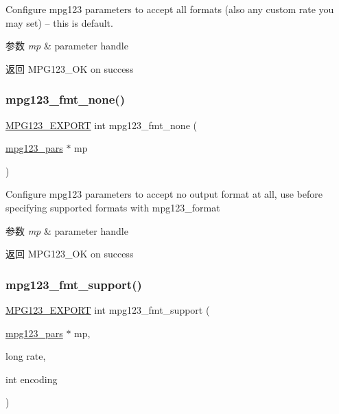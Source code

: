 Configure mpg123 parameters to accept all formats (also any custom rate you may set) -- this is default. 
\begin{DoxyParams}{参数}
{\em mp} & parameter handle \\
\hline
\end{DoxyParams}
\begin{DoxyReturn}{返回}
M\+P\+G123\+\_\+\+OK on success 
\end{DoxyReturn}
\mbox{\label{group__mpg123__advpar_gaf018c28ca2ddcfba5ef7842252ff945a}} 
\subsubsection{\texorpdfstring{mpg123\+\_\+fmt\+\_\+none()}{mpg123\_fmt\_none()}}
{\footnotesize\ttfamily \hyperlink{mpg123_8h_a2ba98cfba3f760879df70e755b2a61cc}{M\+P\+G123\+\_\+\+E\+X\+P\+O\+RT} int mpg123\+\_\+fmt\+\_\+none (\begin{DoxyParamCaption}\item[{\hyperlink{group__mpg123__advpar_ga3983578625af3bb6dc7e3b74d0cab4aa}{mpg123\+\_\+pars} $\ast$}]{mp }\end{DoxyParamCaption})}

Configure mpg123 parameters to accept no output format at all, use before specifying supported formats with mpg123\+\_\+format 
\begin{DoxyParams}{参数}
{\em mp} & parameter handle \\
\hline
\end{DoxyParams}
\begin{DoxyReturn}{返回}
M\+P\+G123\+\_\+\+OK on success 
\end{DoxyReturn}
\mbox{\label{group__mpg123__advpar_gaa9a70e142d765916977be699c82bc603}} 
\subsubsection{\texorpdfstring{mpg123\+\_\+fmt\+\_\+support()}{mpg123\_fmt\_support()}}
{\footnotesize\ttfamily \hyperlink{mpg123_8h_a2ba98cfba3f760879df70e755b2a61cc}{M\+P\+G123\+\_\+\+E\+X\+P\+O\+RT} int mpg123\+\_\+fmt\+\_\+support (\begin{DoxyParamCaption}\item[{\hyperlink{group__mpg123__advpar_ga3983578625af3bb6dc7e3b74d0cab4aa}{mpg123\+\_\+pars} $\ast$}]{mp,  }\item[{long}]{rate,  }\item[{int}]{encoding }\end{DoxyParamCaption})}

